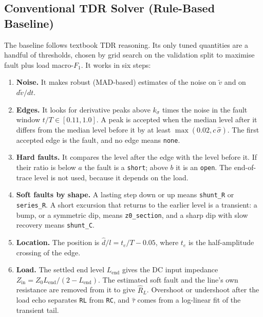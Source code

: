\subsection{Conventional TDR Solver (Rule-Based Baseline)}
The baseline follows textbook TDR reasoning. Its only tuned quantities are a handful of thresholds, chosen by grid search on the validation split to maximise fault plus load macro-$F_1$. It works in six steps:
\begin{enumerate}
    \item \textbf{Noise.} It makes robust (MAD-based) estimates of the noise on $\tilde v$ and on $d\tilde v/dt$.
    \item \textbf{Edges.} It looks for derivative peaks above $k_\sigma$ times the noise in the fault window $t/T \in [0.11, 1.0]$. A peak is accepted when the median level after it differs from the median level before it by at least $\max(0.02, c\,\hat\sigma)$. The first accepted edge is the fault, and no edge means \texttt{none}.
    \item \textbf{Hard faults.} It compares the level after the edge with the level before it. If their ratio is below $a$ the fault is a \texttt{short}; above $b$ it is an \texttt{open}. The end-of-trace level is not used, because it depends on the load.
    \item \textbf{Soft faults by shape.} A lasting step down or up means \texttt{shunt\_R} or \texttt{series\_R}. A short excursion that returns to the earlier level is a transient: a bump, or a symmetric dip, means \texttt{z0\_section}, and a sharp dip with slow recovery means \texttt{shunt\_C}.
    \item \textbf{Location.} The position is $\hat d/l = t_e/T - 0.05$, where $t_e$ is the half-amplitude crossing of the edge.
    \item \textbf{Load.} The settled end level $L_{\mathrm{end}}$ gives the DC input impedance $Z_{\mathrm{in}} = Z_0 L_{\mathrm{end}}/(2 - L_{\mathrm{end}})$. The estimated soft fault and the line's own resistance are removed from it to give $\hat R_L$. Overshoot or undershoot after the load echo separates \texttt{RL} from \texttt{RC}, and $\hat\tau$ comes from a log-linear fit of the transient tail.
\end{enumerate}

